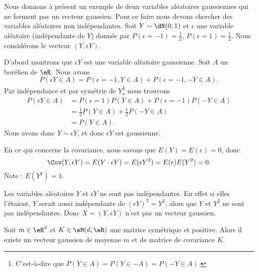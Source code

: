 \begin{example}
	Nous donnons à présent un exemple de deux variables aléatoires gaussiennes qui ne forment pas un vecteur gaussien. Pour ce faire nous devons chercher des variables aléatoires non indépendantes. Soit \( Y\sim \dN(0,1)\) et \( \epsilon\) une variable aléatoire (indépendante de \( Y\)) donnée par \( P(\epsilon=-1)=\frac{ 1 }{2}\), \( P(\epsilon=1)=\frac{ 1 }{2}\). Nous considérons le vecteur \( (Y,\epsilon Y)\).

	D'abord montrons que \( \epsilon Y\) est une variable aléatoire gaussienne. Soit \( A\) un borélien de \( \eR\). Nous avons
	\begin{equation}
		P(\epsilon Y\in A)=P(\epsilon=-1,Y\in A)+P(\epsilon=-1,-Y\in A).
	\end{equation}
	Par indépendance et par symétrie de \( Y\)\footnote{C'est-à-dire que \( P(Y\in A)=P(Y\in -A)=P(-Y\in A)\).} nous trouvons
	\begin{subequations}
		\begin{align}
			P(\epsilon Y\in A) & =P(\epsilon=1)P(Y\in A)+P(\epsilon=-1)P(-Y\in A) \\
			                   & =\frac{ 1 }{2}P(Y\in A)+\frac{ 1 }{2}P(-Y\in A)  \\
			                   & =P(Y\in A).
		\end{align}
	\end{subequations}
	Nous avons donc \( Y\sim \epsilon Y\), et donc \( \epsilon Y\) est gaussienne.

	En ce qui concerne la covariance, nous savons que \( E(Y)=E(\epsilon)=0\), donc
	\begin{equation}
		\Cov(Y,\epsilon Y)=E(Y\cdot \epsilon Y)=E(\epsilon Y^2)=E(\epsilon)E(Y^2)=0.
	\end{equation}
	Note : \( E(Y^2)=1\).

	Les variables aléatoires \( Y\) et \( \epsilon Y\) ne sont pas indépendantes. En effet si elles l'étaient, \( Y\) serait aussi indépendante de \( (\epsilon Y)^2=Y^2\), alors que \( Y\) et \( Y^2\) ne sont pas indépendantes. Donc \( X=(Y,\epsilon Y)\) n'est pas un vecteur gaussien.
\end{example}

\begin{theorem}
	Soit \( m\in \eR^d\) et \( K\in \eM(d,\eR)\) une matrice symétrique et positive. Alors il existe un vecteur gaussien de moyenne \( m\) et de matrice de covariance \( K\).
\end{theorem}

